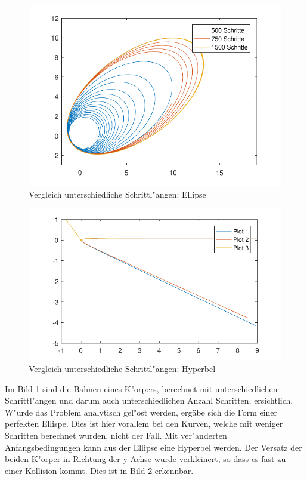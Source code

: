 \begin{refsection}
\begin{figure}
\centering
\includegraphics{schrittlaenge/images/fixStepVergleichEllipse.pdf}
\caption{Vergleich unterschiedliche Schrittl"angen: Ellipse}
\label{image:fixStepVergleichEllipse}
\end{figure}
\begin{figure}
\centering
\includegraphics{schrittlaenge/images/fixStepVergleichHyperbel.pdf}
\caption{Vergleich unterschiedliche Schrittl"angen: Hyperbel}
\label{image:fixStepVergleichHyperbel}
\end{figure}
Im Bild \ref{image:fixStepVergleichEllipse} sind die Bahnen eines K"orpers, berechnet mit unterschiedlichen Schrittl"angen und darum auch unterschiedlichen Anzahl Schritten, ersichtlich.
W"urde das Problem analytisch gel"ost werden, ergäbe sich die Form einer perfekten Ellispe.
Dies ist hier vorallem bei den Kurven, welche mit weniger Schritten berechnet wurden, nicht der Fall.
Mit ver"anderten Anfangsbedingungen kann aus der Ellipse eine Hyperbel werden.
Der Versatz der beiden K"orper in Richtung der y-Achse wurde verkleinert, so dass es fast zu einer Kollision kommt. 
Dies ist in Bild \ref{image:fixStepVergleichHyperbel} erkennbar.


\end{refsection}
